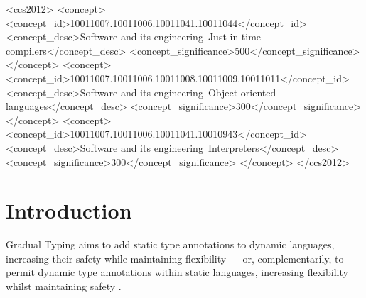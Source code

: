 \documentclass[sigplan,10pt,review,screen]{acmart}\settopmatter{printfolios=true}
\begin{document}
\begin{CCSXML}
<ccs2012>
<concept>
<concept_id>10011007.10011006.10011041.10011044</concept_id>
<concept_desc>Software and its engineering~Just-in-time compilers</concept_desc>
<concept_significance>500</concept_significance>
</concept>
<concept>
<concept_id>10011007.10011006.10011008.10011009.10011011</concept_id>
<concept_desc>Software and its engineering~Object oriented languages</concept_desc>
<concept_significance>300</concept_significance>
</concept>
<concept>
<concept_id>10011007.10011006.10011041.10010943</concept_id>
<concept_desc>Software and its engineering~Interpreters</concept_desc>
<concept_significance>300</concept_significance>
</concept>
</ccs2012>
\end{CCSXML}


\maketitle


\section{Introduction}


Gradual Typing aims to add static type annotations to dynamic languages, increasing
their safety while maintaining flexibility
\citep{GiladPluggable2004,Siek2006,XXXSiek2015}
--- or, complementarily,
to permit dynamic type annotations within static languages, increasing
flexibility whilst maintaining safety
\citep{AbadiTOPLAS1991}.
\end{document}
